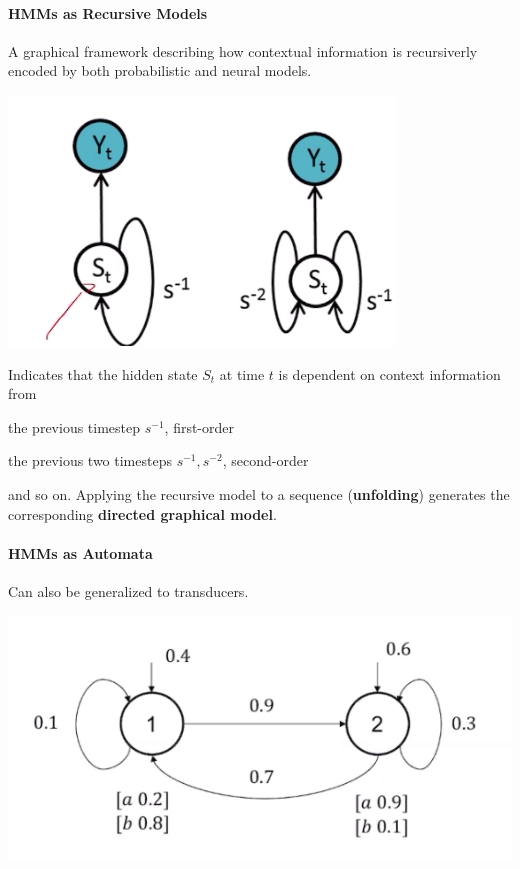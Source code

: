 \documentclass[10pt]{report}
\begin{document}
\paragraph{HMMs as Recursive Models} A graphical framework describing how contextual information is recursiverly encoded by both probabilistic and neural models.
\begin{center}
	\includegraphics[scale=0.5]{28.png}
\end{center}
Indicates that the hidden state $S_t$ at time $t$ is dependent on context information from
\begin{list}{}{}
	\item the previous timestep $s^{-1}$, first-order
	\item the previous two timesteps $s^{-1},s^{-2}$, second-order
\end{list}
and so on. Applying the recursive model to a sequence (\textbf{unfolding}) generates the corresponding \textbf{directed graphical model}.
\paragraph{HMMs as Automata} Can also be generalized to transducers.
\begin{center}
	\includegraphics[scale=0.5]{29.png}
\end{center}
\end{document}
